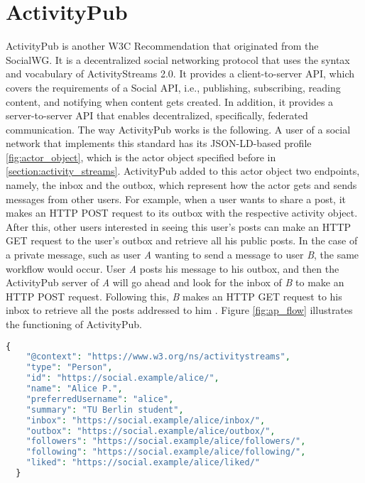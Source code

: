 \section{ActivityPub}

ActivityPub is another W3C Recommendation that originated from the SocialWG. It is a decentralized social networking protocol that uses the syntax and vocabulary of ActivityStreams 2.0. It provides a client-to-server API, which covers the requirements of a Social API\cite{guy_2017}, i.e., publishing, subscribing, reading content, and notifying when content gets created. In addition, it provides a server-to-server API that enables decentralized, specifically, federated communication. The way ActivityPub works is the following. A user of a social network that implements this standard has its JSON-LD-based profile \ref{fig:actor_object}, which is the actor object specified before in \autoref{section:activity_streams}. ActivityPub added to this actor object two endpoints, namely, the inbox and the outbox, which represent how the actor gets and sends messages from other users. For example, when a user wants to share a post, it makes an HTTP POST request to its outbox with the respective activity object. After this, other users interested in seeing this user's posts can make an HTTP GET request to the user's outbox and retrieve all his public posts. In the case of a private message, such as user \emph{A} wanting to send a message to user \emph{B}, the same workflow would occur. User \emph{A} posts his message to his outbox, and then the ActivityPub server of \emph{A} will go ahead and look for the inbox of \emph{B} to make an HTTP POST request. Following this, \emph{B} makes an HTTP GET request to his inbox to retrieve all the posts addressed to him \cite{lemmer-webber_tallon_guy_prodromou_2018}. Figure \ref{fig:ap_flow} illustrates the functioning of ActivityPub. 

\lstset{style=JSONStyle}
\begin{lstlisting}[language=PHP, caption=Actor object example in ActivityPub \cite{lemmer-webber_tallon_guy_prodromou_2018}, label=fig:actor_object, float=h!]
  {
    "@context": "https://www.w3.org/ns/activitystreams",
    "type": "Person",
    "id": "https://social.example/alice/",
    "name": "Alice P.",
    "preferredUsername": "alice",
    "summary": "TU Berlin student",
    "inbox": "https://social.example/alice/inbox/",
    "outbox": "https://social.example/alice/outbox/",
    "followers": "https://social.example/alice/followers/",
    "following": "https://social.example/alice/following/",
    "liked": "https://social.example/alice/liked/"
  }
\end{lstlisting}

